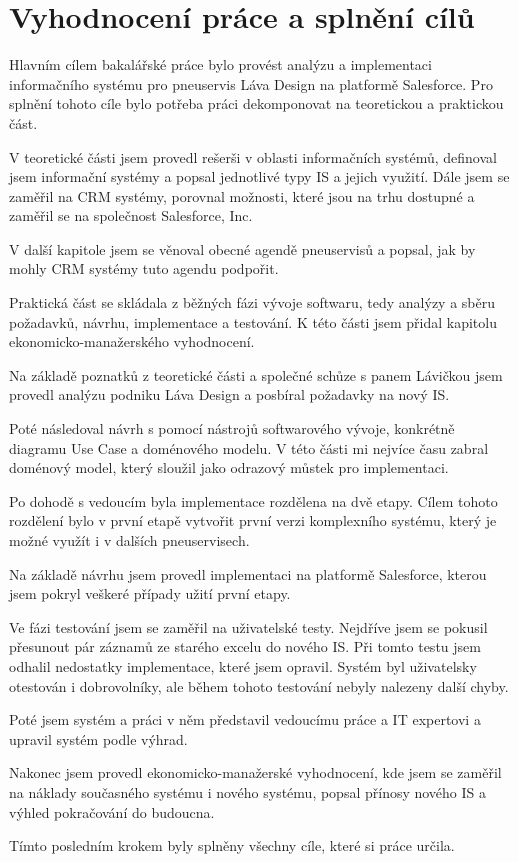 \section{Vyhodnocení práce a splnění cílů}
Hlavním cílem bakalářské práce bylo provést analýzu a implementaci informačního systému pro pneuservis Láva Design na platformě Salesforce. Pro splnění tohoto cíle bylo potřeba práci dekomponovat na teoretickou a praktickou část.

V teoretické části jsem provedl rešerši v oblasti informačních systémů, definoval jsem informační systémy a popsal jednotlivé typy IS a jejich využití. Dále jsem se zaměřil na CRM systémy, porovnal možnosti, které jsou na trhu dostupné a zaměřil se na společnost Salesforce, Inc. 

V další kapitole jsem se věnoval obecné agendě pneuservisů a popsal, jak by mohly CRM systémy tuto agendu podpořit.

Praktická část se skládala z běžných fázi vývoje softwaru, tedy analýzy a sběru požadavků, návrhu, implementace a testování. K této části jsem přidal kapitolu ekonomicko-manažerského vyhodnocení. 

Na základě poznatků z teoretické části a společné schůze s panem Lávičkou jsem provedl analýzu podniku Láva Design a posbíral požadavky na nový IS. 

Poté následoval návrh s pomocí nástrojů softwarového vývoje, konkrétně diagramu Use Case a doménového modelu. V této části mi nejvíce času zabral doménový model, který sloužil jako odrazový můstek pro implementaci.

Po dohodě s vedoucím byla implementace rozdělena na dvě etapy. Cílem tohoto rozdělení bylo v první etapě vytvořit první verzi komplexního systému, který je možné využít i v dalších pneuservisech.

Na základě návrhu jsem provedl implementaci na platformě Salesforce, kterou jsem pokryl veškeré případy užití první etapy.

Ve fázi testování jsem se zaměřil na uživatelské testy. Nejdříve jsem se pokusil přesunout pár záznamů ze starého excelu do nového IS. Při tomto testu jsem odhalil nedostatky implementace, které jsem opravil. Systém byl uživatelsky otestován i dobrovolníky, ale během tohoto testování nebyly nalezeny další chyby.

Poté jsem systém a práci v něm představil vedoucímu práce a IT expertovi a upravil systém podle výhrad.

Nakonec jsem provedl ekonomicko-manažerské vyhodnocení, kde jsem se zaměřil na náklady současného systému i nového systému, popsal přínosy nového IS a výhled pokračování do budoucna.

Tímto posledním krokem byly splněny všechny cíle, které si práce určila.
